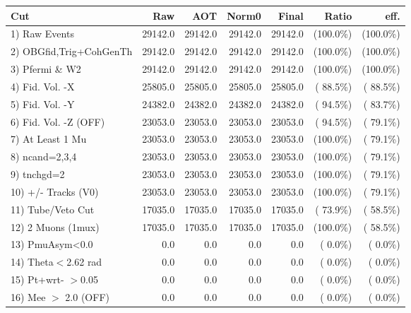  \begin{table}[h!]\centering
 \begin{tabular}{||l||r|r|r|r|r|r||}
 \hline
 \hline
 Cut & Raw & AOT & Norm0 & Final & Ratio & eff.       \\
 \hline
  1) Raw Events           &      29142.0 &      29142.0 &      29142.0 &      29142.0 & (100.0\%) & (100.0\%) \\
  2) OBGfid,Trig+CohGenTh &      29142.0 &      29142.0 &      29142.0 &      29142.0 & (100.0\%) & (100.0\%) \\
  3) Pfermi \& W2         &      29142.0 &      29142.0 &      29142.0 &      29142.0 & (100.0\%) & (100.0\%) \\
  4) Fid. Vol. -X         &      25805.0 &      25805.0 &      25805.0 &      25805.0 & ( 88.5\%) & ( 88.5\%) \\
  5) Fid. Vol. -Y         &      24382.0 &      24382.0 &      24382.0 &      24382.0 & ( 94.5\%) & ( 83.7\%) \\
  6) Fid. Vol. -Z (OFF)   &      23053.0 &      23053.0 &      23053.0 &      23053.0 & ( 94.5\%) & ( 79.1\%) \\
  7) At Least 1 Mu        &      23053.0 &      23053.0 &      23053.0 &      23053.0 & (100.0\%) & ( 79.1\%) \\
  8) ncand=2,3,4          &      23053.0 &      23053.0 &      23053.0 &      23053.0 & (100.0\%) & ( 79.1\%) \\
  9) tnchgd=2             &      23053.0 &      23053.0 &      23053.0 &      23053.0 & (100.0\%) & ( 79.1\%) \\
 10) +/- Tracks (V0)      &      23053.0 &      23053.0 &      23053.0 &      23053.0 & (100.0\%) & ( 79.1\%) \\
 11) Tube/Veto Cut        &      17035.0 &      17035.0 &      17035.0 &      17035.0 & ( 73.9\%) & ( 58.5\%) \\
 12) 2 Muons (1mux)       &      17035.0 &      17035.0 &      17035.0 &      17035.0 & (100.0\%) & ( 58.5\%) \\
 13) PmuAsym<0.0          &          0.0 &          0.0 &          0.0 &          0.0 & (  0.0\%) & (  0.0\%) \\
 14) Theta$<$2.62 rad     &          0.0 &          0.0 &          0.0 &          0.0 & (  0.0\%) & (  0.0\%) \\
 15) Pt+wrt- $>$0.05      &          0.0 &          0.0 &          0.0 &          0.0 & (  0.0\%) & (  0.0\%) \\
 16) Mee $>$ 2.0  (OFF)   &          0.0 &          0.0 &          0.0 &          0.0 & (  0.0\%) & (  0.0\%) \\

\end{tabular}
\end{table}
